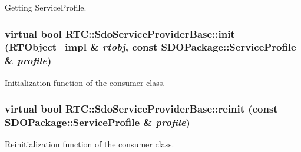 Getting ServiceProfile. 

\subsubsection[{init}]{\setlength{\rightskip}{0pt plus 5cm}virtual bool RTC::SdoServiceProviderBase::init ({\bf RTObject\_\-impl} \& {\em rtobj}, \/  const SDOPackage::ServiceProfile \& {\em profile})\hspace{0.3cm}{\ttfamily  [pure virtual]}}\label{classRTC_1_1SdoServiceProviderBase_aaded0e28430b3a14fa894ceb73cf4616}


Initialization function of the consumer class. 

\subsubsection[{reinit}]{\setlength{\rightskip}{0pt plus 5cm}virtual bool RTC::SdoServiceProviderBase::reinit (const SDOPackage::ServiceProfile \& {\em profile})\hspace{0.3cm}{\ttfamily  [pure virtual]}}\label{classRTC_1_1SdoServiceProviderBase_a125f6f0482326ef7054e1f1cf0485c83}


Reinitialization function of the consumer class. 

